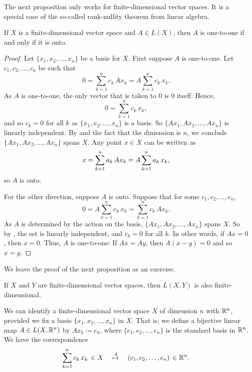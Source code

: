 The next proposition only works for finite-dimensional vector spaces.
It is a special case of the so-called rank-nullity theorem from linear
algebra.

\begin{prop} \label{mv:prop:lin11onto}
If $X$ is a finite-dimensional vector space and $A \in L(X)$, then $A$ is one-to-one if and only if it is onto.
\end{prop}

\begin{proof}
Let $\{ x_1,x_2,\ldots,x_n \}$ be a basis for $X$.
First suppose $A$ is one-to-one.  Let $c_1,c_2,\ldots,c_n$ be such that
\begin{equation*}
0 =
\sum_{k=1}^n c_k \, Ax_k =
A\sum_{k=1}^n c_k \, x_k 
.
\end{equation*}
As $A$ is one-to-one,
the only vector that is taken to 0 is 0 itself.  
Hence,
\begin{equation*}
0 =
\sum_{k=1}^n c_k \, x_k,
\end{equation*}
and so $c_k = 0$ for all $k$ as $\{ x_1,x_2,\ldots,x_n \}$ is a basis.
So $\{ Ax_1, Ax_2, \ldots, Ax_n \}$ is linearly independent.
By 
and the fact that the dimension is $n$, we conclude
$\{ Ax_1, Ax_2, \ldots, Ax_n \}$ spans $X$.  Any point $x \in X$
can be written as
\begin{equation*}
x = \sum_{k=1}^n a_k \, Ax_k =
A\sum_{k=1}^n a_k \, x_k ,
\avoidbreak
\end{equation*}
so $A$ is onto.

For the other direction, suppose $A$ is onto.
Suppose that for some
$c_1,c_2,\ldots,c_n$,
\begin{equation*}
0 = A\sum_{k=1}^n c_k \, x_k =
\sum_{k=1}^n c_k \, Ax_k .
\end{equation*}
As $A$ is determined by the action on the basis,
$\{ Ax_1, Ax_2, \ldots, Ax_n \}$ spans $X$.
So by , the set is linearly independent,
and $c_k = 0$ for all $k$.  In other words, if $Ax = 0$, then $x=0$.
Thus, $A$ is one-to-one:  If $Ax = Ay$, then $A(x-y) = 0$ and so
$x=y$.
\end{proof}

We leave the proof of the next proposition as an exercise.

\begin{prop} \label{prop:LXYfinitedim}
If $X$ and $Y$ are finite-dimensional vector spaces, then $L(X,Y)$
is also finite-dimensional.
\end{prop}

We can identify a finite-dimensional vector
space $X$ of dimension $n$ with ${\mathbb{R}}^n$, provided we fix a basis
$\{ x_1, x_2, \ldots, x_n \}$ in $X$.  That is, we define a bijective
linear map $A \in L(X,{\mathbb{R}}^n)$ by
$Ax_k \coloneqq e_k$, where $\{ e_1, e_2, \ldots, e_n \}$ is the standard
basis in ${\mathbb{R}}^n$.  We have
the correspondence
\begin{equation*}
\sum_{k=1}^n c_k \, x_k \, \in X
\quad
\overset{A}{\mapsto}
\quad
(c_1,c_2,\ldots,c_n) \, \in {\mathbb{R}}^n .
\end{equation*}

